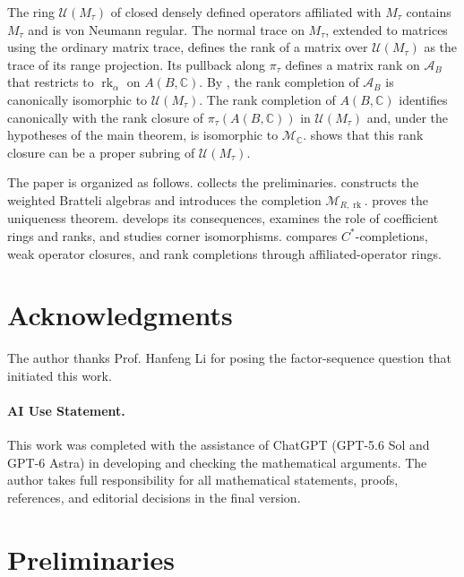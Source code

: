 \documentclass[11pt]{amsart}
\DeclareMathOperator{\rk}{rk}
\theoremstyle{definition}
\theoremstyle{remark}
\begin{document}
The ring $\mathcal U(M_\tau)$ of closed densely defined operators
affiliated with $M_\tau$ contains $M_\tau$ and is von Neumann regular.
The normal trace on $M_\tau$, extended to matrices using the ordinary
matrix trace, defines the rank of a matrix over $\mathcal U(M_\tau)$
as the trace of its range projection.
Its pullback along $\pi_\tau$ defines a matrix rank on $\mathcal A_B$
that restricts to $\rk_\alpha$ on $A(B,\mathbb C)$.
By , the rank completion of
$\mathcal A_B$ is canonically isomorphic to $\mathcal U(M_\tau)$.
The rank completion of $A(B,\mathbb C)$ identifies canonically with
the rank closure of $\pi_\tau(A(B,\mathbb C))$ in $\mathcal U(M_\tau)$
and, under the hypotheses of the main theorem, is isomorphic to
$\mathcal M_{\mathbb C}$.
 shows that this rank closure can
be a proper subring of $\mathcal U(M_\tau)$.

The paper is organized as follows.
 collects the preliminaries.
 constructs the weighted Bratteli algebras
and introduces the completion $\mathcal M_{R,\rk}$.
 proves the uniqueness theorem.
 develops its consequences, examines the role of
coefficient rings and ranks, and studies corner isomorphisms.
 compares $C^*$-completions, weak operator
closures, and rank completions through affiliated-operator rings.

\section*{Acknowledgments}
The author thanks Prof. Hanfeng Li for posing the factor-sequence question that
initiated this work.

\paragraph{\textbf{AI Use Statement.}}
This work was completed with the assistance of ChatGPT
(GPT-5.6 Sol and GPT-6 Astra) in developing and checking
the mathematical arguments.
The author takes full responsibility for all mathematical
statements, proofs, references, and editorial decisions
in the final version.

\section{Preliminaries}\label{sec:rank-completions}
\end{document}

